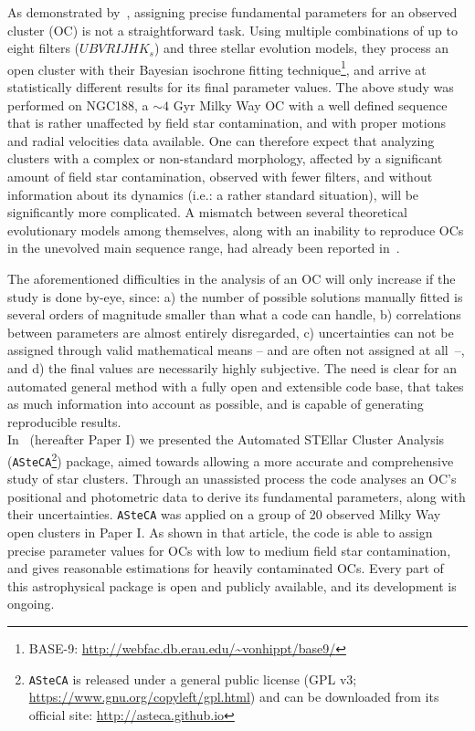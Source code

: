 \documentclass{aa}
\begin{document}
As demonstrated by~\cite{Hills_2015}, assigning precise fundamental
parameters for an observed cluster (OC) is not a straightforward task. Using
multiple combinations of up to eight filters ($UBVRIJHK_s$) and three stellar
evolution models, they process an open cluster with their Bayesian isochrone
fitting technique\footnote{BASE-9: 
\url{http://webfac.db.erau.edu/~vonhippt/base9/}}, and arrive at statistically
different results for its final parameter values.
%
The above study was performed on NGC188, a ${\sim}4$ Gyr Milky Way OC with a
well defined sequence that is rather unaffected by field star contamination, and
with proper motions and radial velocities data available.
One can therefore expect that analyzing clusters with a complex or non-standard
morphology, affected by a significant amount of field star contamination,
observed with fewer filters, and without information about its dynamics (i.e.:
a rather standard situation), will be significantly more complicated.
%
A mismatch between several theoretical evolutionary models among themselves,
along with an inability to reproduce OCs in the unevolved main sequence
range, had already been reported in~\cite{Grocholski_2003}.

The aforementioned difficulties in the analysis of an OC will only increase if
the study is done by-eye, since: a) the number of possible solutions manually
fitted is several orders of magnitude smaller than what a code can
handle, b) correlations between parameters are almost entirely disregarded, c)
uncertainties can not be assigned through valid mathematical
means -- and are often not assigned at \mbox{all --}, and d) the final values
are necessarily highly subjective.
%
The need is clear for an automated general method with a fully open and
extensible code base, that takes as much information into account as possible,
and is capable of generating reproducible results.\\

In~\cite{Perren_2015} (hereafter Paper I) we presented the Automated STEllar
Cluster Analysis
(\texttt{ASteCA}\footnote{\texttt{ASteCA} is released under a general public
license (GPL v3; \url{https://www.gnu.org/copyleft/gpl.html}) and
can be downloaded from its official site: \url{http://asteca.github.io}})
package, aimed towards allowing a more accurate and comprehensive study of star
clusters.
Through an unassisted process the code analyses an OC's positional and
photometric data to derive its fundamental parameters, along with their
uncertainties.
\texttt{ASteCA} was applied on a group of 20 observed Milky Way open clusters
in Paper I. As shown in that article, the code is able to assign precise
parameter values for OCs with low to medium field star contamination, and gives
reasonable estimations for heavily contaminated OCs.
Every part of this astrophysical package is open and publicly available, and its
development is ongoing.
\end{document}
